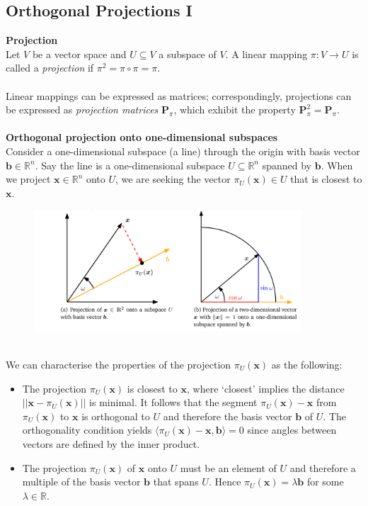 \documentclass{report}
\begin{document}
\subsection{Orthogonal Projections I}%
\textbf{Projection}\\
Let $V$ be a vector space and $U\subseteq V$ a subspace of $V$. A linear mapping 
$\pi:V\to U$ is called a \textit{projection} if $\pi^2=\pi\circ\pi=\pi$.\\
\vspace{1mm}\\
Linear mappings can be expressed as matrices; correspondingly, projections can be expressed as
\textit{projection matrices} $\bm{P}_\pi$, which 
exhibit the property $\bm{P}_\pi^2=\bm{P}_\pi$.\\
\vspace{1mm}\\
\textbf{Orthogonal projection onto one-dimensional subspaces}\\
Consider a one-dimensional subspace (a line) through the origin with basis vector $\bm{b}\in\mathbb{R}^n$. 
Say the line is a one-dimensional subspace $U\subseteq\mathbb{R}^n$ spanned by $\bm{b}$.
When we project $\bm{x}\in\mathbb{R}^n$ onto $U$, we are seeking the vector $\pi_U(\bm{x})\in U$ that is 
closest to $\bm{x}$.
\begin{figure}[h]
\includegraphics[width=10cm]{8}\\
\centering
\end{figure}\\
We can characterise the properties of the projection $\pi_U(\bm{x})$ as the following:
\begin{itemize}
\item The projection $\pi_U(\bm{x})$ is closest to $\bm{x}$, where `closest' implies the distance
$||\bm{x}-\pi_U(\bm{x})||$ is minimal. It follows that the segment $\pi_U(\bm{x})-\bm{x}$
from $\pi_U(\bm{x})$ to $\bm{x}$ is orthogonal to $U$ and therefore the basis vector $\bm{b}$ of $U$.
The orthogonality condition yields $\langle\pi_U(\bm{x})-\bm{x},\bm{b}\rangle=0$ since angles between
vectors are defined by the inner product.
\item The projection $\pi_U(\bm{x})$ of $\bm{x}$ onto $U$ must be an element of $U$ and therefore a multiple
of the basis vector $\bm{b}$ that spans $U$. Hence $\pi_U(\bm{x})=\lambda\bm{b}$ for some $\lambda\in\mathbb{R}$.
\end{itemize}
\end{document}
